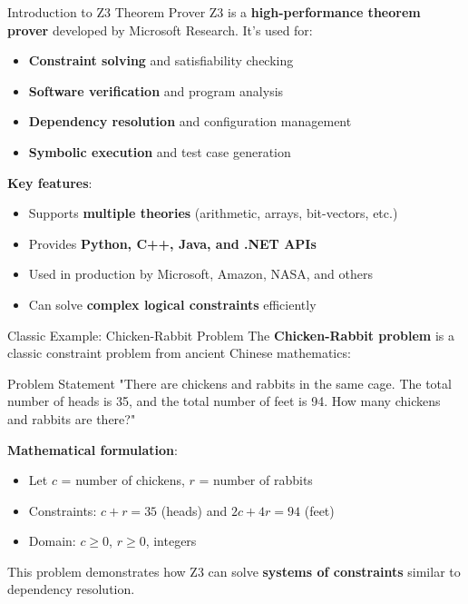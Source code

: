 \documentclass{beamer}
\begin{document}
\begin{frame}[t]{Introduction to Z3 Theorem Prover}
Z3 is a \textbf{high-performance theorem prover} developed by Microsoft Research. It's used for:
\begin{itemize}
\item \textbf{Constraint solving} and satisfiability checking
\item \textbf{Software verification} and program analysis
\item \textbf{Dependency resolution} and configuration management
\item \textbf{Symbolic execution} and test case generation
\end{itemize}

\bigskip

\textbf{Key features}:
\begin{itemize}
\item Supports \textbf{multiple theories} (arithmetic, arrays, bit-vectors, etc.)
\item Provides \textbf{Python, C++, Java, and .NET APIs}
\item Used in production by Microsoft, Amazon, NASA, and others
\item Can solve \textbf{complex logical constraints} efficiently
\end{itemize}
\end{frame}

\begin{frame}[t]{Classic Example: Chicken-Rabbit Problem}
The \textbf{Chicken-Rabbit problem} is a classic constraint problem from ancient Chinese mathematics:

\begin{block}{Problem Statement}
"There are chickens and rabbits in the same cage. The total number of heads is 35, and the total number of feet is 94. How many chickens and rabbits are there?"
\end{block}

\textbf{Mathematical formulation}:
\begin{itemize}
\item Let $c$ = number of chickens, $r$ = number of rabbits
\item Constraints: $c + r = 35$ (heads) and $2c + 4r = 94$ (feet)
\item Domain: $c \geq 0$, $r \geq 0$, integers
\end{itemize}

This problem demonstrates how Z3 can solve \textbf{systems of constraints} similar to dependency resolution.
\end{frame}
\end{document}
